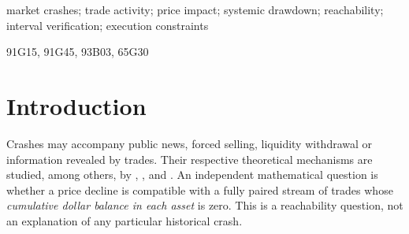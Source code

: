 \documentclass[review,hidelinks,onefignum,onetabnum]{siamonline250211}%
\begin{document}
\raggedbottom
\maketitle
\begin{abstract}
Matched-dollar transfers can produce systemic terminal price losses even when
fundamental benchmarks are fixed and every asset's cumulative executed-dollar
ledger closes at zero. We replace recovery in physical time by recovery driven
exclusively by gross executed-dollar activity. The resulting nonlinear control
system has no price motion without transactions. A nine-edge three-asset
protocol establishes local all-asset declines for arbitrary smooth positive
response functions, while scalar activity floors and execution-resource
inequalities restrict severe losses. In the constant-impact model, a
continuous-direction argument provides analytic existence constructions for
all ten prices to end at half their benchmarks, and for nine prices to become
arbitrarily small with uniform finite turnover and inventory budgets.
A separate internally interval-checked, no-instantaneous-netting ten-asset
path makes five assets close at the lower limit of successive $\pm25\%$
rolling sessions. The path has finite gross share-execution rate and an
equal-weight geometric-index loss above $16\%$. These are deterministic
reachability results, not equilibrium crash predictions.
\end{abstract}
\begin{keywords}market crashes; trade activity; price impact; systemic drawdown; reachability; interval verification; execution constraints\end{keywords}
\begin{MSCcodes}91G15, 91G45, 93B03, 65G30\end{MSCcodes}

\section{Introduction}\label{sec:intro}
Crashes may accompany public news, forced selling, liquidity withdrawal or
information revealed by trades. Their respective theoretical mechanisms are
studied, among others, by \citet{GennotteLeland1990,Romer1993},
\citet{HuangWang2009,CespaFoucault2014}, and \citet{ContWagalath2013}.
An independent mathematical question is whether a price decline is compatible
with a fully paired stream of trades whose \emph{cumulative dollar balance
in each asset} is zero. This is a reachability question, not an explanation
of any particular historical crash.
\end{document}
